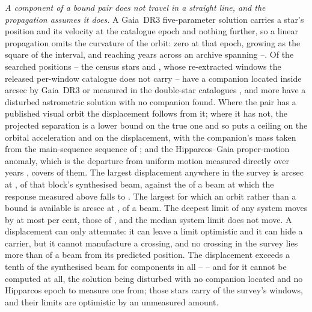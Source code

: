 \emph{A component of a bound pair does not travel in a straight line, and the
propagation assumes it does.} A Gaia~DR3 five-parameter solution carries a
star's position and its velocity at the catalogue epoch and nothing further,
so a linear propagation omits the curvature of the orbit: zero at that epoch,
growing as the square of the interval, and reaching years across an archive
spanning \OmEpochLo--\OmEpochHi. Of the \OmNStar{} searched positions --
the \OmNCensusStar{} census stars and \OmXStar, whose re-extracted windows
the released per-window catalogue does not carry --
\OmNComponent{} have a companion located inside \OmRadius{} arcsec by
Gaia~DR3 or measured in the double-star catalogues
\citep{wds,orb6}, and \OmNIndOnly{} more
have a disturbed astrometric solution with no companion found. Where the pair
has a published visual orbit the displacement follows from it; where it has
not, the projected separation is a lower bound on the true one and so puts a
ceiling on the orbital acceleration and on the displacement, with the
companion's mass taken from the main-sequence sequence of
\citet{pecaut2013}; and the
Hipparcos--Gaia proper-motion anomaly, which is the departure from uniform
motion measured directly over \OmHGInterval{} years
\citep{kervella2022}, covers \OmNPma{} of
them. The largest displacement anywhere in the survey is \OmWorstArcsec{}
arcsec at \OmWorstStar, \OmWorstBeams{} of that block's synthesised beam,
against the \SensPxLargeBeams{} of a beam at which the response measured
above falls to \SensPxLargePred. The largest for which an orbit rather than a
bound is available is
\OmMeasArcsec{} arcsec at \OmMeasStar, \OmMeasBeams{} of a beam. The deepest
limit of any system moves by at most \OmSysMovedMaxPct{} per cent, those of
\OmSysMovedStars, and the median system limit does not move. A displacement
can only attenuate: it can leave a limit optimistic and it can hide a
carrier, but it cannot manufacture a crossing, and no crossing in the survey
lies more than \OmCrossWorstBeams{} of a beam from its predicted position.
The displacement exceeds a tenth of the synthesised beam for \OmNTenth{}
components in all -- \OmTenthStars{} -- and for \OmFlagStars{} it cannot be
computed at all, the solution being disturbed with no companion located and no
Hipparcos epoch to measure one from; those \OmNFlag{} stars carry
\OmNWinFlag{} of the survey's windows, and their limits are optimistic by an
unmeasured amount.

